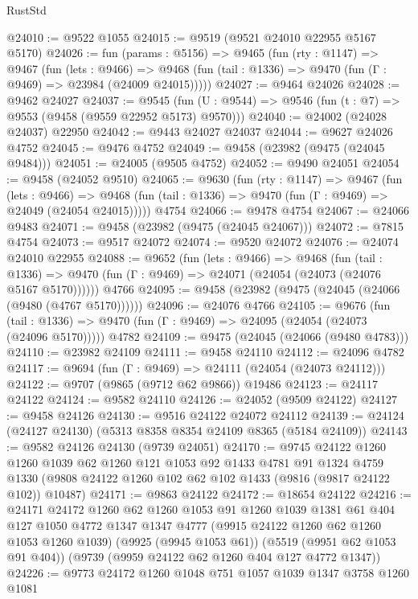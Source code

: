\begin{lexlean}{RustStd}
\begin{coremodule}
@24010 := @9522 @1055
@24015 := @9519 (@9521 @24010 @22955 @5167 @5170)
@24026 := fun (params : @5156) =>
  @9465
    (fun (rty : @1147) =>
    @9467
      (fun (lets : @9466) =>
      @9468 (fun (tail : @1336) => @9470 (fun (Γ : @9469) => @23984 (@24009 @24015)))))
@24027 := @9464 @24026
@24028 := @9462 @24027
@24037 := @9545
    (fun (U : @9544) => @9546 (fun (t : @7) => @9553 (@9458 (@9559 @22952 @5173) @9570)))
@24040 := @24002 (@24028 @24037) @22950
@24042 := @9443 @24027 @24037
@24044 := @9627 @24026 @4752
@24045 := @9476 @4752
@24049 := @9458 (@23982 (@9475 (@24045 @9484)))
@24051 := @24005 (@9505 @4752)
@24052 := @9490 @24051
@24054 := @9458 (@24052 @9510)
@24065 := @9630
    (fun (rty : @1147) =>
    @9467
      (fun (lets : @9466) =>
      @9468 (fun (tail : @1336) => @9470 (fun (Γ : @9469) => @24049 (@24054 @24015)))))
    @4754
@24066 := @9478 @4754
@24067 := @24066 @9483
@24071 := @9458 (@23982 (@9475 (@24045 @24067)))
@24072 := @7815 @4754
@24073 := @9517 @24072
@24074 := @9520 @24072
@24076 := @24074 @24010 @22955
@24088 := @9652
    (fun (lets : @9466) =>
    @9468
      (fun (tail : @1336) =>
      @9470 (fun (Γ : @9469) => @24071 (@24054 (@24073 (@24076 @5167 @5170))))))
    @4766
@24095 := @9458 (@23982 (@9475 (@24045 (@24066 (@9480 (@4767 @5170))))))
@24096 := @24076 @4766
@24105 := @9676
    (fun (tail : @1336) => @9470 (fun (Γ : @9469) => @24095 (@24054 (@24073 (@24096 @5170)))))
    @4782
@24109 := @9475 (@24045 (@24066 (@9480 @4783)))
@24110 := @23982 @24109
@24111 := @9458 @24110
@24112 := @24096 @4782
@24117 := @9694 (fun (Γ : @9469) => @24111 (@24054 (@24073 @24112)))
@24122 := @9707 (@9865 (@9712 @62 @9866)) @19486
@24123 := @24117 @24122
@24124 := @9582 @24110
@24126 := @24052 (@9509 @24122)
@24127 := @9458 @24126
@24130 := @9516 @24122 @24072 @24112
@24139 := @24124 (@24127 @24130) (@5313 @8358 @8354 @24109 @8365 (@5184 @24109))
@24143 := @9582 @24126 @24130 (@9739 @24051)
@24170 := @9745
    @24122
    @1260
    @1260
    @1039
    @62
    @1260
    @121
    @1053
    @92
    @1433
    @4781
    @91
    @1324
    @4759
    @1330
    (@9808 @24122 @1260 @102 @62 @102 @1433 (@9816 (@9817 @24122 @102)) @10487)
@24171 := @9863 @24122
@24172 := @18654 @24122
@24216 := @24171
    @24172
    @1260
    @62
    @1260
    @1053
    @91
    @1260
    @1039
    @1381
    @61
    @404
    @127
    @1050
    @4772
    @1347
    @1347
    @4777
    (@9915 @24122 @1260 @62 @1260 @1053 @1260 @1039)
    (@9925 (@9945 @1053 @61))
    (@5519 (@9951 @62 @1053 @91 @404))
    (@9739 (@9959 @24122 @62 @1260 @404 @127 @4772 @1347))
@24226 := @9773 @24172 @1260 @1048 @751 @1057 @1039 @1347 @3758 @1260 @1081

\end{coremodule}
\end{lexlean}
